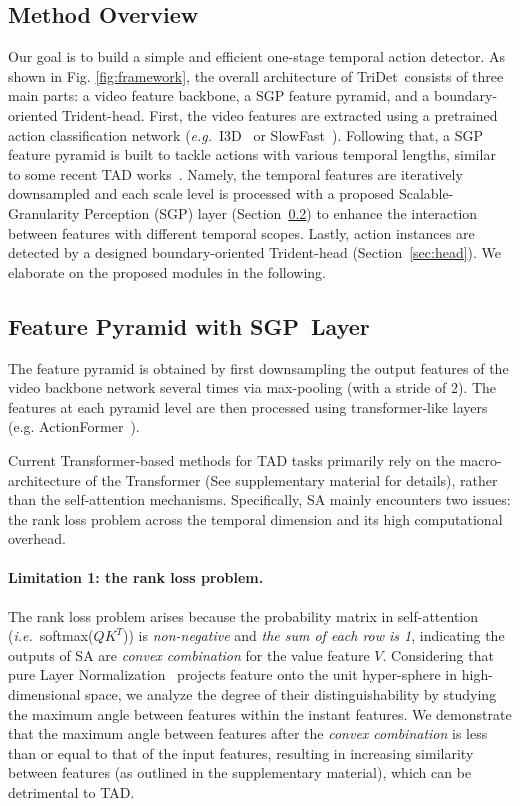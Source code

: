 \documentclass[10pt,twocolumn,letterpaper]{article}
\def\ie{{\em i.e.}}
\def\eg{{\em e.g.}}
\newcommand{\figref}[1]{Fig. \ref{#1}}
\def\name{TriDet}
\def\modulename{SGP}
\begin{document}
\subsection{Method Overview}
Our goal is to build a simple and efficient one-stage temporal action detector. 
As shown in \figref{fig:framework}, the overall architecture of \name~consists of three main parts: a video feature backbone, a SGP feature pyramid, and a boundary-oriented Trident-head. 
First, the video features are extracted using a pretrained action classification network (\eg{~I3D~\cite{carreira2017quo} or SlowFast~\cite{feichtenhofer2019slowfast}}). Following that, a SGP feature pyramid is built to tackle actions with various temporal lengths, similar to some recent TAD works~\cite{lin2021learning,zhang2022actionformer,cheng2022tallformer}.
Namely, the temporal features are iteratively downsampled and each scale level is processed with a proposed Scalable-Granularity Perception (\modulename) layer (Section~\ref{sec:efp}) to enhance the interaction between features with different temporal scopes. 
Lastly, action instances are detected by a designed boundary-oriented Trident-head (Section~\ref{sec:head}). 
We elaborate on the proposed modules in the following. 


\subsection{Feature Pyramid with \modulename~Layer}
\label{sec:efp}

The feature pyramid is obtained by first downsampling the output features of the video backbone network several times via max-pooling (with a stride of 2). The features at each pyramid level are then processed using transformer-like layers (e.g. ActionFormer~\cite{zhang2022actionformer}). 

Current Transformer-based methods for TAD tasks primarily rely on the macro-architecture of the Transformer (See supplementary material for details), rather than the self-attention mechanisms. Specifically, SA mainly encounters two issues: the rank loss problem across the temporal dimension and its high computational overhead.

\paragraph{Limitation 1: the rank loss problem.}
The rank loss problem arises because the probability matrix in self-attention (\ie~softmax($QK^T$)) is \emph{non-negative} and \emph{the sum of each row is 1}, indicating the outputs of SA are \emph{convex combination} for the value feature $V$. Considering that pure Layer Normalization~\cite{ba2016layer} projects feature onto the unit hyper-sphere in high-dimensional space, we analyze the degree of their distinguishability by studying the maximum angle between features within the instant features. We demonstrate that the maximum angle between features after the \emph{convex combination} is less than or equal to that of the input features, resulting in increasing similarity between features (as outlined in the supplementary material), which can be detrimental to TAD. 
\end{document}
